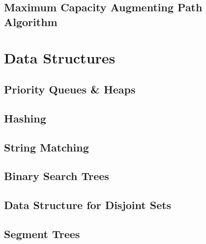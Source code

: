 \documentclass{article}
\begin{document}
\subsection{Maximum Capacity Augmenting Path Algorithm}
\newpage


\section{Data Structures}
\subsection{Priority Queues \& Heaps}
\subsection{Hashing}
\subsection{String Matching}
\subsection{Binary Search Trees}
\subsection{Data Structure for Disjoint Sets}
\subsection{Segment Trees}
\newpage

\end{document}
